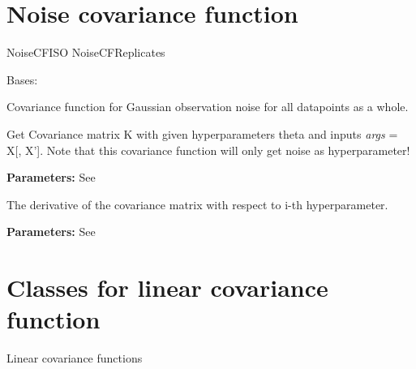 \documentclass[letterpaper,10pt,english]{sphinxmanual}
\begin{document}
\label{covars:module-pygp.covar.noise}

\section{Noise covariance function}
\label{covars:noise-covariance-function}
NoiseCFISO
NoiseCFReplicates

\begin{fulllineitems}
\label{covars:pygp.covar.noise.NoiseCFISO}
Bases: 

Covariance function for Gaussian observation noise for
all datapoints as a whole.

\begin{fulllineitems}
\label{covars:pygp.covar.noise.NoiseCFISO.K}
Get Covariance matrix K with given hyperparameters theta and inputs \emph{args} = X{[}, X'{]}. Note that this covariance function will only get noise as hyperparameter!

\textbf{Parameters:}
See {\hyperref[covars:pygp.covar.CovarianceFunction]{}}

\end{fulllineitems}


\begin{fulllineitems}
\label{covars:pygp.covar.noise.NoiseCFISO.Kgrad_theta}
The derivative of the covariance matrix with
respect to i-th hyperparameter.

\textbf{Parameters:}
See {\hyperref[covars:pygp.covar.CovarianceFunction]{}}

\end{fulllineitems}


\end{fulllineitems}

\label{covars:module-pygp.covar.linear}

\section{Classes for linear covariance function}
\label{covars:classes-for-linear-covariance-function}
Linear covariance functions
\end{document}

